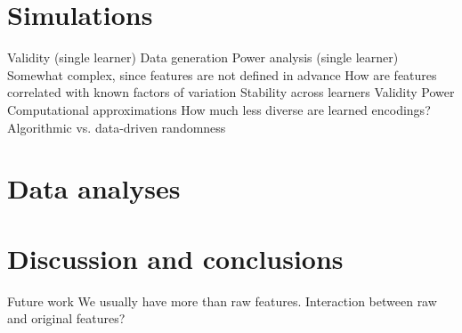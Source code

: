 \documentclass[11pt]{article}
\begin{document}
\section{Simulations}

\begin{outline}
  \1 Validity (single learner)
    \2 Data generation
  \1 Power analysis (single learner)
    \2 Somewhat complex, since features are not defined in advance
    \2 How are features correlated with known factors of variation
  \1 Stability across learners
    \2 Validity
    \2 Power
  \1 Computational approximations
    \2 How much less diverse are learned encodings?
  \1 Algorithmic vs. data-driven randomness
\end{outline}

\section{Data analyses}


\section{Discussion and conclusions}

\begin{outline}
  \1 Future work
    \2 We usually have more than raw features. Interaction between raw and
    original features?
\end{outline}



\end{document}
